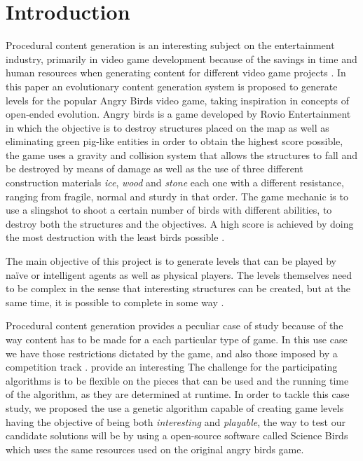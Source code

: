 \documentclass[conference]{IEEEtran}
\begin{document}
    \section{Introduction}
    Procedural content generation is an interesting subject on the entertainment
    industry, primarily in video game development because of the savings in 
    time and human resources when generating content for different video game projects \cite{Yannakakis2017,YannakakisContentGeneration}.
    In this paper an evolutionary content generation system is proposed to generate
    levels for the popular Angry Birds video game,
    taking inspiration in concepts of open-ended evolution. Angry birds is a game 
    developed by Rovio Entertainment in which the objective is to destroy structures
    placed on the map as well as eliminating
    green pig-like entities in order to obtain the highest score possible, the game
    uses a gravity and collision system that allows the structures to fall and be
    destroyed by means of damage as well as the use of three different construction
    materials \textit{ice}, \textit{wood} and \textit{stone} each one with a different
    resistance, ranging from fragile, normal and sturdy in that order. The game
    mechanic is to use a slingshot to shoot a certain number of birds with different
    abilities, to destroy both the structures and the objectives. A high score 
    is achieved by doing the most destruction with the least birds possible 
    \cite{RovioEntertainmentCorporation2009}.
    
    The main objective of this project is to generate levels that can be played
    by naïve or intelligent agents as well as physical players. The levels
    themselves need to be complex in the sense that interesting structures can be
    created, but at the same time, it is possible to complete in some way
    \cite{Stephenson,Stephenson2018}.
    
    Procedural content generation provides a peculiar case of study because of the
    way
    content has to be made for a each particular type of game. In this use case we
    have those restrictions dictated by the game, and also those imposed by a
    competition track \cite{Renz}.%
    provide an interesting The challenge for the participating algorithms is to be
    flexible on the pieces that can be used and the running time of the algorithm, as
    they are determined at runtime. 
    In order to tackle this case study, we proposed the use a genetic algorithm capable 
    of creating game levels having the objective of being both \textit{interesting} and 
    \textit{playable}, the way to test our candidate solutions will be by using a open-source
    software called Science Birds \cite{sciencebirds} which uses the same resources used on the
    original angry birds game.
    
\end{document}
